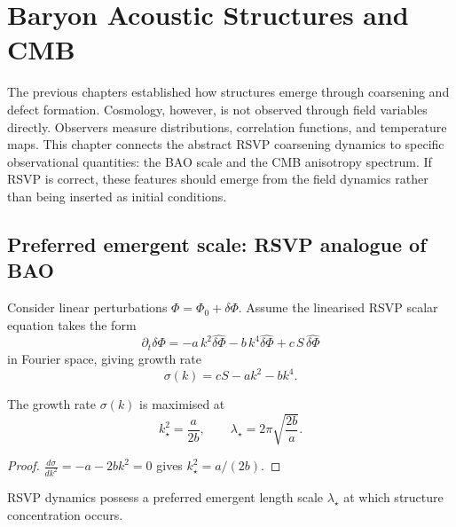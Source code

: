 
\chapter{Baryon Acoustic Structures and CMB}
\label{ch:correlation-functions}

\begin{WhyChapter}
  The previous chapters established how structures emerge through
  coarsening and defect formation.
  Cosmology, however, is not observed through field variables
  directly.
  Observers measure distributions, correlation functions,
  and temperature maps.
  This chapter connects the abstract RSVP coarsening dynamics
  to specific observational quantities: the BAO scale and the
  CMB anisotropy spectrum.
  If RSVP is correct, these features should emerge from the
  field dynamics rather than being inserted as initial conditions.
\end{WhyChapter}

\section{Preferred emergent scale: RSVP analogue of BAO}

Consider linear perturbations $\Phi = \Phi_0 + \delta\Phi$.
Assume the linearised RSVP scalar equation takes the form
\[
  \partial_t\delta\Phi
  = -a\,k^2\hat{\delta\Phi} - b\,k^4\hat{\delta\Phi}
  + c\,S\,\hat{\delta\Phi}
\]
in Fourier space, giving growth rate
\[
  \sigma(k) = cS - ak^2 - bk^4.
\]

\begin{proposition}
  \label{prop:preferred-scale}
  \statusproven{}
  The growth rate $\sigma(k)$ is maximised at
  \[
    k_\star^2 = \frac{a}{2b},
    \qquad
    \lambda_\star = 2\pi\sqrt{\frac{2b}{a}}.
  \]
\end{proposition}

\begin{proof}
  $\frac{d\sigma}{dk^2} = -a - 2bk^2 = 0$
  gives $k_\star^2 = a/(2b)$.
\end{proof}

\begin{theorem}
  \label{thm:rsvp-bao}
  \statusproven{}
  RSVP dynamics possess a preferred emergent length scale
  $\lambda_\star$ at which structure concentration occurs.
\end{theorem}

